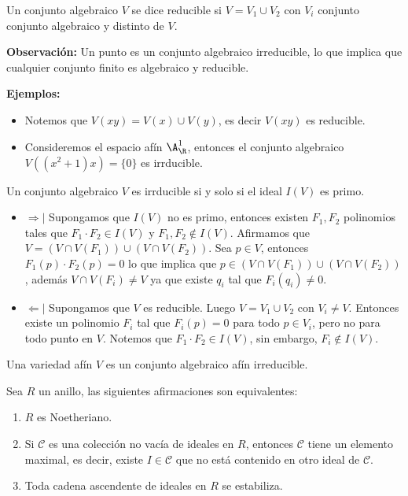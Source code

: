 \documentclass{article}
\begin{document}
\begin{dfn}
    Un conjunto algebraico $V$ se dice reducible si $V=V_{1}\cup V_{2}$ con $V_{i}$ conjunto
    conjunto algebraico y distinto de $V$.
\end{dfn}

\noindent\textbf{Observación: } Un punto es un conjunto algebraico irreducible, lo que implica que
cualquier conjunto finito es algebraico y reducible.

\noindent\textbf{Ejemplos: }
\begin{itemize}
    \item Notemos que $V(xy)=V(x)\cup V(y)$, es decir $V(xy)$ es reducible.
    \item Consideremos el espacio afín $\A_{\R}^{1}$, entonces el conjunto algebraico 
    $V((x^{2}+1)x)=\{0\}$ es irrducible.
\end{itemize}

\begin{prop}
    Un conjunto algebraico $V$ es irrducible si y solo si el ideal $I(V)$ es primo.
\end{prop}

\begin{dem}\hspace{1mm}
    \begin{itemize}
        \item $\Rightarrow|$ Supongamos que $I(V)$ no es primo, entonces existen $F_{1},F_{2}$ 
        polinomios tales que $F_{1}\cdot F_{2}\in I(V)$ y $F_{1},F_{2}\notin I(V)$. Afirmamos que
        $V=(V\cap V(F_{1}))\cup(V\cap V(F_{2}))$. Sea $p\in V$, entonces $F_{1}(p)\cdot F_{2}(p)=0$
        lo que implica que $p\in(V\cap V(F_{1}))\cup(V\cap V(F_{2}))$, además 
        $V\cap V(F_{i})\neq V$ ya que existe $q_{i}$ tal que $F_{i}(q_{i})\neq 0$.

        \item $\Leftarrow|$ Supongamos que $V$ es reducible. Luego $V=V_{1}\cup V_{2}$ con 
        $V_{i}\neq V$. Entonces existe un polinomio $F_{i}$ tal que $F_{i}(p)=0$ para todo 
        $p\in V_{i}$, pero no para todo punto en $V$. Notemos que $F_{1}\cdot F_{2}\in I(V)$, 
        sin embargo, $F_{i}\notin I(V)$.
    \end{itemize}
\end{dem}

\begin{dfn}
    Una variedad afín $V$ es un conjunto algebraico afín irreducible.
\end{dfn}

\begin{lema}
    Sea $R$ un anillo, las siguientes afirmaciones son equivalentes:
    \begin{enumerate}
        \item $R$ es Noetheriano.
        \item Si  $\mathcal{C}$ es una colección no vacía de ideales en $R$, entonces
        $\mathcal{C}$ tiene un elemento maximal, es decir, existe $I\in\mathcal{C}$ que no está 
        contenido en otro ideal de $\mathcal{C}$.
        \item Toda cadena ascendente de ideales en $R$ se estabiliza.
    \end{enumerate}
\end{lema}
\end{document}
